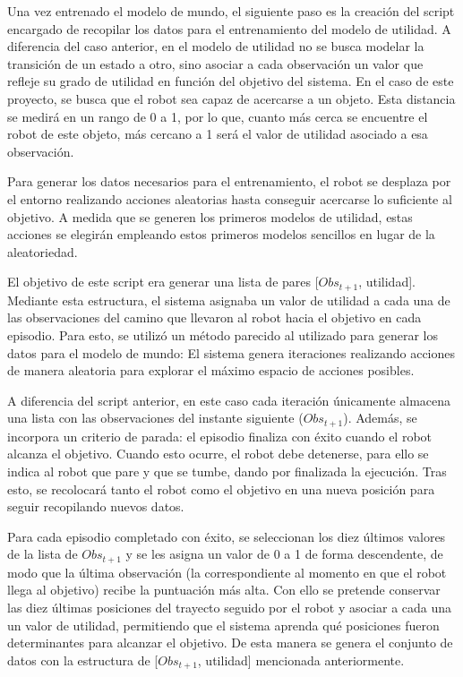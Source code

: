 Una vez entrenado el modelo de mundo, el siguiente paso es la creación del \gls{script} encargado de recopilar los datos para el entrenamiento del modelo de utilidad. A diferencia del caso 
anterior, en el modelo de utilidad no se busca modelar la transición de un estado a otro, sino asociar a cada observación un valor que refleje su grado de utilidad en función del objetivo del 
sistema. En el caso de este proyecto, se busca que el robot sea capaz de acercarse a un objeto. Esta distancia se medirá en un rango de 0 a 1, por lo que, cuanto más cerca se encuentre el 
robot de este objeto, más cercano a 1 será el valor de utilidad asociado a esa observación.

Para generar los datos necesarios para el entrenamiento, el robot se desplaza por el entorno realizando acciones aleatorias hasta conseguir acercarse lo suficiente al objetivo. A medida que 
se generen los primeros modelos de utilidad, estas acciones se elegirán empleando estos primeros modelos sencillos en lugar de la aleatoriedad.

El objetivo de este \gls{script} era generar una lista de pares [\( Obs_{t+1} \), utilidad]. Mediante esta estructura, el sistema asignaba un valor de utilidad a cada una de las observaciones del 
camino que llevaron al robot hacia el objetivo en cada episodio. Para esto, se utilizó un método parecido al utilizado para generar los datos para el modelo de mundo: El sistema genera 
iteraciones realizando acciones de manera aleatoria para explorar el máximo espacio de acciones posibles.

A diferencia del \gls{script} anterior, en este caso cada iteración únicamente almacena una lista con las observaciones del instante siguiente (\( Obs_{t+1} \)). Además, se incorpora un 
criterio de parada: el episodio finaliza con éxito cuando el robot alcanza el objetivo. Cuando esto ocurre, el robot debe detenerse, para ello se indica al robot que pare y que se tumbe, 
dando por finalizada la ejecución. Tras esto, se recolocará tanto el robot como el objetivo en una nueva posición para seguir recopilando nuevos datos.

Para cada episodio completado con éxito, se seleccionan los diez últimos valores de la lista de \( Obs_{t+1} \) y se les asigna un valor de 0 a 1 de forma descendente, de modo que la última 
observación (la correspondiente al momento en que el robot llega al objetivo) recibe la puntuación más alta. Con ello se pretende conservar las diez últimas posiciones del trayecto seguido 
por el robot y asociar a cada una un valor de utilidad, permitiendo que el sistema aprenda qué posiciones fueron determinantes para alcanzar el objetivo. De esta manera se genera el conjunto 
de datos con la estructura de [\( Obs_{t+1} \), utilidad] mencionada anteriormente.


